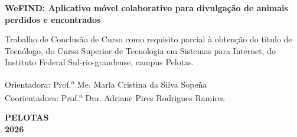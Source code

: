 \thispagestyle{empty}

\begin{center}
\end{center}

\vspace{7.5cm}

\begin{center}
    \textbf{WeFIND: Aplicativo móvel colaborativo para divulgação de animais perdidos e encontrados}
\end{center}

\vspace{1.8cm}

\begin{flushright}
\begin{minipage}{10.8cm}
    \singlespacing
    \small
    Trabalho de Conclusão de Curso como requisito parcial à obtenção do título de Tecnólogo, do Curso Superior de Tecnologia em Sistemas para Internet, do Instituto Federal Sul-rio-grandense, campus Pelotas.
    
    \vspace{0.6cm}
    
    \raggedright
    Orientadora: Prof.\textsuperscript{a} Me. Marla Cristina da Silva Sopeña \\
    \vspace{0.15cm}
    Coorientadora: Prof.\textsuperscript{a} Dra. Adriane Pires Rodrigues Ramires
\end{minipage}
\end{flushright}

\vfill

\begin{center}
    \textbf{PELOTAS} \\
    \vspace{0.2cm}
    \textbf{2026}
\end{center}

\restoregeometry
\clearpage